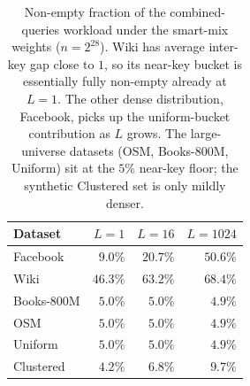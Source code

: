 \begin{table}[H]
    \centering
    \begin{tabular}{@{}lrrr@{}}
        \toprule
        Dataset & $L=1$ & $L=16$ & $L=1024$ \\
        \midrule
        Facebook   & $9.0\%$  & $20.7\%$ & $50.6\%$ \\
        Wiki       & $46.3\%$ & $63.2\%$ & $68.4\%$ \\
        Books-800M & $5.0\%$  & $5.0\%$  & $4.9\%$  \\
        OSM        & $5.0\%$  & $5.0\%$  & $4.9\%$  \\
        Uniform   & $5.0\%$  & $5.0\%$  & $4.9\%$  \\
        Clustered & $4.2\%$  & $6.8\%$  & $9.7\%$  \\
        \bottomrule
    \end{tabular}
    \caption{Non-empty fraction of the combined-queries workload
        under the smart-mix weights ($n = 2^{28}$). Wiki has
        average inter-key gap close to $1$, so its near-key bucket
        is essentially fully non-empty already at $L = 1$. The
        other dense distribution, Facebook, picks up the
        uniform-bucket contribution as $L$ grows. The
        large-universe datasets (OSM, Books-800M, Uniform) sit at
        the $5\%$ near-key floor; the synthetic Clustered set is
        only mildly denser.}
    \label{tab:nonempty-fraction}
\end{table}
